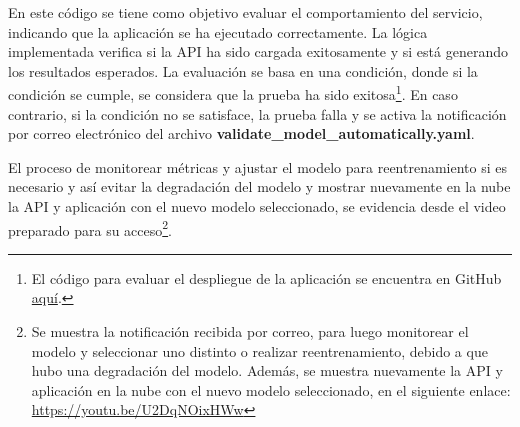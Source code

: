 En este código se tiene como objetivo evaluar el comportamiento del servicio, indicando que la aplicación se ha ejecutado correctamente. La lógica implementada verifica si la API ha sido cargada exitosamente y si está generando los resultados esperados. La evaluación se basa en una condición, donde si la condición se cumple, se considera que la prueba ha sido exitosa\footnote{El código para evaluar el despliegue de la aplicación se encuentra en GitHub \href{https://github.com/juferoto/mlops_project/blob/master/application/tests/test_service.py}{aquí}.}. En caso contrario, si la condición no se satisface, la prueba falla y se activa la notificación por correo electrónico del archivo \textbf{validate\_model\_automatically.yaml}. \newline

El proceso de monitorear métricas y ajustar el modelo para reentrenamiento si es necesario y así evitar la degradación del modelo y mostrar nuevamente en la nube la API y aplicación con el nuevo modelo seleccionado, se evidencia desde el video preparado para su acceso\footnote{Se muestra la notificación recibida por correo, para luego monitorear el modelo y seleccionar uno distinto o realizar reentrenamiento, debido a que hubo una degradación del modelo. Además, se muestra nuevamente la API y aplicación en la nube con el nuevo modelo seleccionado, en el siguiente enlace: \href{https://youtu.be/U2DqNOixHWw}{https://youtu.be/U2DqNOixHWw}}.

